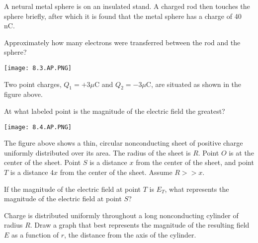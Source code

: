 \documentclass[../em.tex]{subfiles}
\begin{document}
\ex A netural metal sphere is on an insulated stand. A charged rod then touches the sphere briefly, after which it is found that the metal sphere has a charge of 40 nC. 

Approximately how many electrons were transferred between the rod and the sphere?

\ex \begin{center}
    \texttt{[image: 8.3.AP.PNG]}
\end{center}
Two point charges, $Q_1=+3\mu$C and $Q_2=-3\mu$C, are situated as shown in the figure above. 

At what labeled point is the magnitude of the electric field the greatest?

\pagebreak
\ex \begin{center}
    \texttt{[image: 8.4.AP.PNG]}
\end{center}
The figure above shows a thin, circular nonconducting sheet of positive charge uniformly distributed over its area. The radius of the sheet is $R$. Point $O$ is at the center of the sheet.
Point $S$ is a distance $x$ from the center of the sheet, and point $T$ is a distance $4x$ from the center of the sheet. Assume $R>>x$. 

If the magnitude of the electric field at point $T$ is $E_T$, what represents the magnitude of the electric field at point $S$?

\ex Charge is distributed uniformly throughout a long nonconducting cylinder of radius $R$. Draw a graph that best represents the magnitude of the resulting field $E$ as a function of $r$, the distance from the axis of the cylinder.
\end{document}
